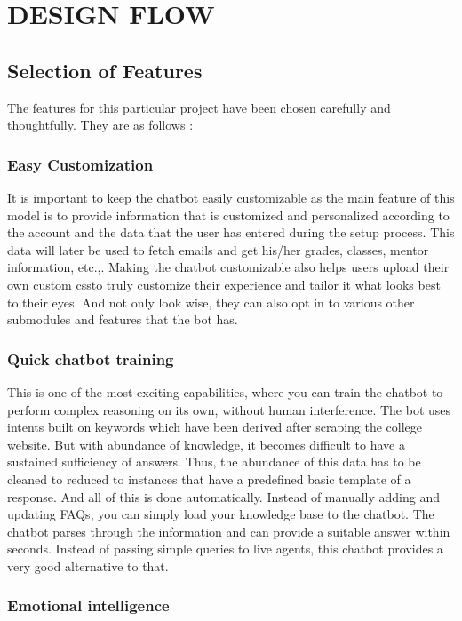 \documentclass[14pt]{extarticle}
\begin{document}
\newpage
\section{DESIGN FLOW}

\subsection{Selection of Features}

The features for this particular project have been chosen carefully and thoughtfully. They are as follows :

\subsubsection {Easy Customization}

It is important to keep the chatbot easily customizable as the main feature of this model is to provide information that is customized and personalized according to the account and the data that the user has entered during the setup process. This data will later be used to fetch emails and get his/her grades, classes, mentor information, etc.,. Making the chatbot customizable also helps users upload their own custom cssto truly customize their experience and tailor it what looks best to their eyes. And not only look wise, they can also opt in to various other submodules and features that the bot has.

\subsubsection {Quick chatbot training}

This is one of the most exciting capabilities, where you can train the chatbot to perform complex reasoning on its own, without human interference. The bot uses intents built on keywords which have been derived after scraping the college website. But with abundance of knowledge, it becomes difficult to have a sustained sufficiency of answers. Thus, the abundance of this data has to be cleaned to reduced to instances that have a predefined basic template of a response. And all of this is done automatically. Instead of manually adding and updating FAQs, you can simply load your knowledge base to the chatbot. The chatbot parses through the information and can provide a suitable answer within seconds. Instead of passing simple queries to live agents, this chatbot provides a very good alternative to that.

\subsubsection{Emotional intelligence}
\end{document}
